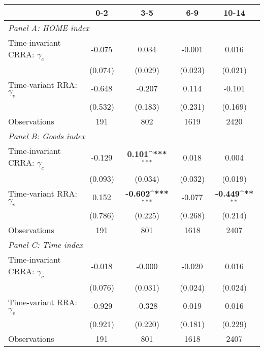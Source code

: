 {
\def\sym#1{\ifmmode^{#1}\else\(^{#1}\)\fi}
\begin{tabular}{l*{4}{c}}
\toprule
                &0-2&3-5&6-9&10-14\\
\midrule
\multicolumn{5}{l}{\textit{Panel A: HOME index}} \\
Time-invariant CRRA: $\gamma_c$&   -0.075         &    0.034         &   -0.001         &    0.016         \\
                &  (0.074)         &  (0.029)         &  (0.023)         &  (0.021)         \\

Time-variant RRA: $\gamma_v$&   -0.648         &   -0.207         &    0.114         &   -0.101         \\
                &  (0.532)         &  (0.183)         &  (0.231)         &  (0.169)         \\
\midrule
Observations    &      191         &      802         &     1619         &     2420         \\



\midrule
\multicolumn{5}{l}{\textit{Panel B: Goods index}} \\
Time-invariant CRRA: $\gamma_c$&   -0.129         &    \textbf{0.101\sym{***}}&    0.018         &    0.004         \\
                &  (0.093)         &  (0.034)         &  (0.032)         &  (0.019)         \\

Time-variant RRA: $\gamma_v$&    0.152         &   \textbf{-0.602\sym{***}}&   -0.077         &   \textbf{-0.449\sym{**}} \\
                &  (0.786)         &  (0.225)         &  (0.268)         &  (0.214)         \\
\midrule
Observations    &      191         &      801         &     1618         &     2407         \\




\midrule
\multicolumn{5}{l}{\textit{Panel C: Time index}} \\
Time-invariant CRRA: $\gamma_c$&   -0.018         &   -0.000         &   -0.020         &    0.016         \\
                &  (0.076)         &  (0.031)         &  (0.024)         &  (0.024)         \\
Time-variant RRA: $\gamma_v$&   -0.929         &   -0.328         &    0.019         &    0.016         \\
                &  (0.921)         &  (0.220)         &  (0.181)         &  (0.229)         \\
\midrule
Observations    &      191         &      801         &     1618         &     2407         \\





\end{tabular}}
